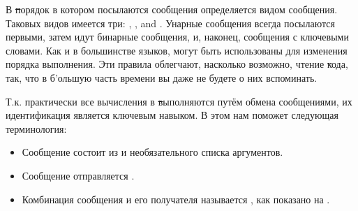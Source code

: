 \documentclass[a4paper,10pt,twoside]{book}
\begin{document}
В \st порядок в котором посылаются сообщения определяется видом сообщения. Таковых видов имеется три: , , and . Унарные сообщения всегда посылаются первыми, затем идут бинарные сообщения, и, наконец, сообщения с ключевыми словами. Как и в большинстве языков,  могут быть использованы для изменения порядка выполнения. Эти правила облегчают, насколько возможно, чтение \st кода, так, что в б'ольшую часть времени вы даже не будете о них вспоминать.

Т.к. практически все вычисления в \st выполняются путём обмена сообщениями, их идентификация является ключевым навыком. В этом нам поможет следующая терминология:

\begin{itemize}
  \item Сообщение состоит из  и необязательного списка аргументов.
  \item Сообщение отправляется .
  \item Комбинация сообщения и его получателя называется , как показано на .
\end{itemize}
\end{document}
